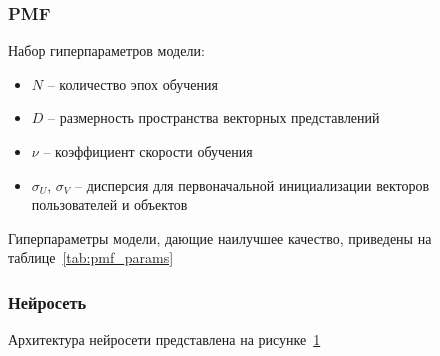 \subsubsection{PMF}
Набор гиперпараметров модели:
\begin{itemize}
    \item $N$ -- количество эпох обучения
    \item $D$ -- размерность пространства векторных представлений
    \item $\nu$ -- коэффициент скорости обучения
    \item $\sigma_{U}$, $\sigma_{V}$ -- дисперсия для первоначальной инициализации векторов пользователей и объектов
\end{itemize}

Гиперпараметры модели, дающие наилучшее качество, приведены на таблице~\ref{tab:pmf_params}
\begin{table}[h]
    \caption{Гиперпараметры PMF}
    \label{tab:pmf_params}
\end{table}

\subsubsection{Нейросеть}
Архитектура нейросети представлена на рисунке~\ref{fig:nn_arch}
\begin{figure}[h!]
\caption{}
\label{fig:nn_arch}
\end{figure}

